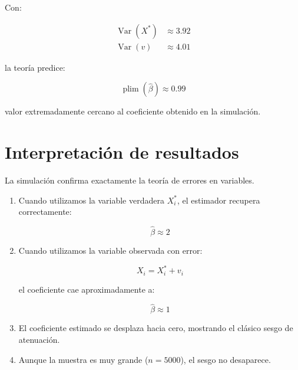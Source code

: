 \documentclass[12pt,letterpaper]{article}
\newcommand{\Var}{\operatorname{Var}}
\newcommand{\plim}{\operatorname{plim}}
\begin{document}
Con:

\begin{align}
\Var(X^{*}) &\approx 3.92 \\
\Var(v) &\approx 4.01
\end{align}

la teoría predice:

\begin{equation}
\plim(\hat{\beta})
\approx
0.99
\end{equation}

valor extremadamente cercano al coeficiente obtenido en la simulación.

\section{Interpretación de resultados}

La simulación confirma exactamente la teoría de errores en variables.

\begin{enumerate}[leftmargin=1.8em]

\item Cuando utilizamos la variable verdadera $X_i^{*}$,
el estimador recupera correctamente:

\begin{equation}
\hat{\beta}\approx2
\end{equation}

\item Cuando utilizamos la variable observada con error:

\begin{equation}
X_i=X_i^{*}+v_i
\end{equation}

el coeficiente cae aproximadamente a:

\begin{equation}
\hat{\beta}\approx1
\end{equation}

\item El coeficiente estimado se desplaza hacia cero,
mostrando el clásico sesgo de atenuación.

\item Aunque la muestra es muy grande ($n=5000$),
el sesgo no desaparece.

\end{enumerate}

\end{document}
